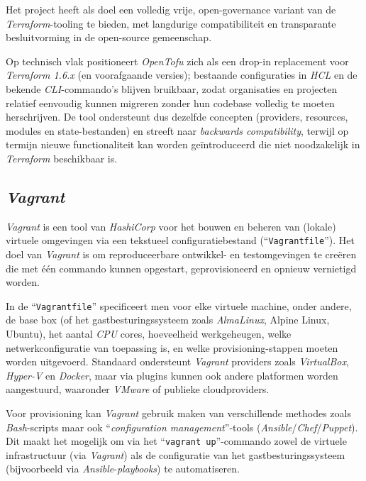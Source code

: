 Het project heeft als doel een volledig vrije, open-governance variant van de \emph{Terraform}-tooling te bieden, met langdurige compatibiliteit en transparante besluitvorming in de open-source gemeenschap.

Op technisch vlak positioneert \emph{OpenTofu} zich als een drop-in replacement voor \emph{Terraform 1.6.x} (en voorafgaande versies); bestaande configuraties in \emph{HCL} en de bekende \emph{CLI}-commando's blijven bruikbaar, zodat organisaties en projecten relatief eenvoudig kunnen migreren zonder hun codebase volledig te moeten herschrijven.
De tool ondersteunt dus dezelfde concepten (providers, resources, modules en state-bestanden) en streeft naar \emph{backwards compatibility}, terwijl op termijn nieuwe functionaliteit kan worden geïntroduceerd die niet noodzakelijk in \emph{Terraform} beschikbaar is. \autocite{OpenTofu2026}

\subsection{\emph{Vagrant}}%

\emph{Vagrant} is een tool van \emph{HashiCorp} voor het bouwen en beheren van (lokale) virtuele omgevingen via een tekstueel configuratiebestand (``\texttt{Vagrantfile}'').
Het doel van \emph{Vagrant} is om reproduceerbare ontwikkel- en testomgevingen te creëren die met één commando kunnen opgestart, geprovisioneerd en opnieuw vernietigd worden. \autocite{HashiCorp2026}

In de ``\texttt{Vagrantfile}'' specificeert men voor elke virtuele machine, onder andere, de base box (of het gastbesturingssysteem zoals \emph{AlmaLinux}, Alpine Linux, Ubuntu), het aantal \emph{CPU} cores, hoeveelheid werkgeheugen, welke netwerkconfiguratie van toepassing is, en welke provisioning-stappen moeten worden uitgevoerd.
Standaard ondersteunt \emph{Vagrant} providers zoals \emph{VirtualBox}, \emph{Hyper-V} en \emph{Docker}, maar via plugins kunnen ook andere platformen worden aangestuurd, waaronder \emph{VMware} of publieke cloudproviders. \autocite{HashiCorp2026a}

Voor provisioning kan \emph{Vagrant} gebruik maken van verschillende methodes zoals \emph{Bash}-scripts maar ook ``\emph{configuration management}''-tools (\emph{Ansible}/\emph{Chef}/\emph{Puppet}).
Dit maakt het mogelijk om via het ``\texttt{vagrant up}''-commando zowel de virtuele infrastructuur (via \emph{Vagrant}) als de configuratie van het gastbesturingssysteem (bijvoorbeeld via \emph{Ansible}-\emph{playbooks}) te automatiseren. \autocite{HashiCorp2026a}

